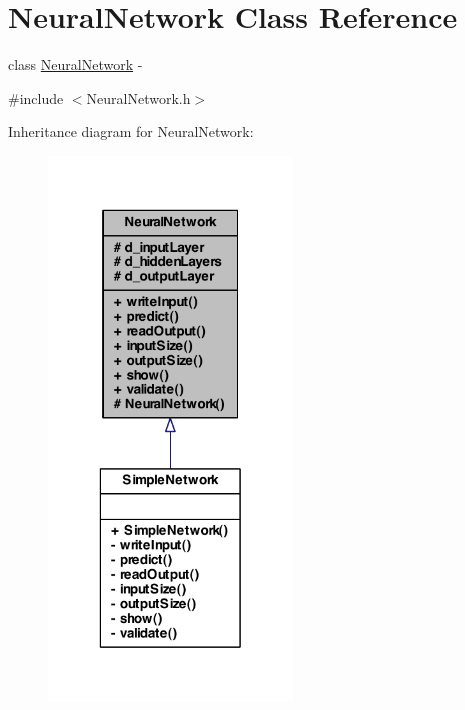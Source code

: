 \hypertarget{class_neural_network}{
\section{NeuralNetwork Class Reference}
\label{class_neural_network}
}


class \hyperlink{class_neural_network}{NeuralNetwork} -\/  




{\ttfamily \#include $<$NeuralNetwork.h$>$}



Inheritance diagram for NeuralNetwork:
\nopagebreak
\begin{figure}[H]
\begin{center}
\leavevmode
\includegraphics[width=184pt]{class_neural_network__inherit__graph}
\end{center}
\end{figure}
